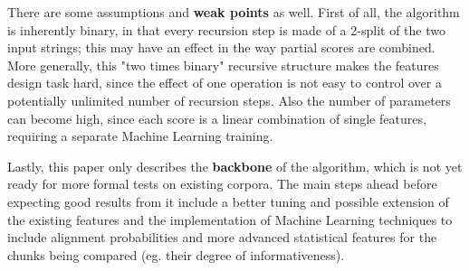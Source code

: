 There are some assumptions and \textbf{weak points} as well. First of all, the algorithm is inherently binary, in that every recursion step is made of a 2-split of the two input strings; this may have an effect in the way partial scores are combined. More generally, this "two times binary" recursive structure makes the features design task hard, since the effect of one operation is not easy to control over a potentially unlimited number of recursion steps. Also the number of parameters can become high, since each score is a linear combination of single features, requiring a separate Machine Learning training.

Lastly, this paper only describes the \textbf{backbone} of the algorithm, which is not yet ready for more formal tests on existing corpora. The main steps ahead before expecting good results from it include a better tuning and possible extension of the existing features  and the implementation of Machine Learning techniques to include alignment probabilities and more advanced statistical features for the chunks being compared (eg. their degree of informativeness).





